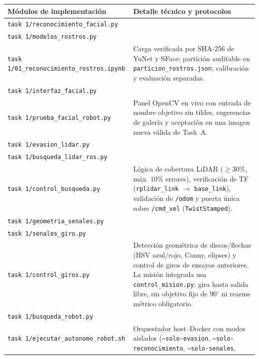 \documentclass[11pt,a4paper]{article}
\renewcommand{\arraystretch}{1.22}
\begin{document}
\begin{table}[htbp]
  \centering
  \footnotesize
  \renewcommand{\arraystretch}{1.05}
  \begin{tabularx}{\textwidth}{@{}P{6.2cm}Y@{}}
    \hline
    \textbf{Módulos de implementación} & \textbf{Detalle técnico y protocolos}\\
    \hline
    \texttt{task 1/reconocimiento\_\allowbreak facial.py}\\
    \texttt{task 1/modelos\_\allowbreak rostros.py}\\
    \texttt{task 1/01\_\allowbreak reconocimiento\_\allowbreak rostros.ipynb} &
    Carga verificada por SHA-256 de YuNet y SFace; partición auditable en
    \texttt{particion\_\allowbreak rostros.json}; calibración y evaluación
    separadas.\\
    \texttt{task 1/interfaz\_\allowbreak facial.py}\\
    \texttt{task 1/prueba\_\allowbreak facial\_\allowbreak robot.py} &
    Panel OpenCV en vivo con entrada de nombre objetivo sin tildes, sugerencias
    de galería y aceptación en una imagen nueva válida de Task~A.\\
    \texttt{task 1/evasion\_\allowbreak lidar.py}\\
    \texttt{task 1/busqueda\_\allowbreak lidar\_\allowbreak ros.py}\\
    \texttt{task 1/control\_\allowbreak busqueda.py} &
    Lógica de cobertura LiDAR ($\ge 30\%$, máx. $10\%$ errores), verificación de
    TF (\texttt{rplidar\_\allowbreak link} $\rightarrow$ \texttt{base\_\allowbreak link}),
    validación de \texttt{/odom} y puerta única sobre \texttt{/cmd\_\allowbreak vel}
    (\texttt{TwistStamped}).\\
    \texttt{task 1/geometria\_\allowbreak senales.py}\\
    \texttt{task 1/senales\_\allowbreak giro.py}\\
    \texttt{task 1/control\_\allowbreak giros.py} &
    Detección geométrica de discos/flechas (HSV azul/rojo, Canny, elipses) y
    control de giros de ensayos anteriores. La misión integrada usa
    \texttt{control\_mision.py}: gira hasta salida libre, sin objetivo fijo
    de $90^\circ$ ni rearme métrico obligatorio.\\
    \texttt{task 1/busqueda\_\allowbreak robot.py}\\
    \texttt{task 1/ejecutar\_\allowbreak autonomo\_\allowbreak robot.sh} &
    Orquestador host--Docker con modos aislados (\texttt{--solo-evasion},
    \texttt{--solo-reconocimiento}, \texttt{--solo-senales},

\end{tabularx}
\end{table}
\end{document}

